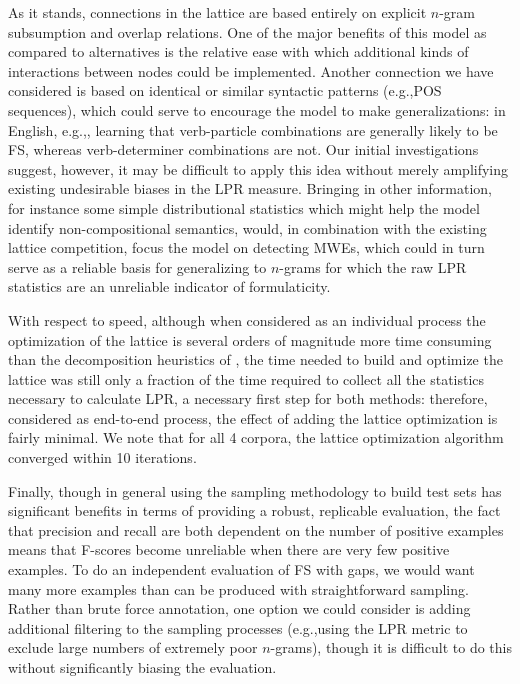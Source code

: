 \documentclass[11pt,letterpaper]{article}
\makeatletter
\def \eg {e.g.,\@ }
\makeatother
\begin{document}
As it stands, connections in the lattice are based entirely on explicit $n$-gram subsumption and overlap relations. One of the major benefits of this model as compared to alternatives is the relative ease with which additional kinds of interactions between nodes could be implemented. Another connection we have considered is based on identical or similar syntactic patterns (\eg POS sequences), which could serve to encourage the model to make generalizations: in English, \eg, learning that verb-particle combinations are generally likely to be FS, whereas verb-determiner combinations are not. Our initial investigations suggest, however, it may be difficult to apply this idea without merely amplifying existing undesirable biases in the LPR measure. Bringing in other information, for instance some simple distributional statistics which might help the model identify non-compositional semantics, would, in combination with the existing lattice competition, focus the model on detecting MWEs, which could in turn serve as a reliable basis for generalizing to $n$-grams for which the raw LPR statistics are an unreliable indicator of formulaticity.

With respect to speed, although when considered as an individual process the optimization of the lattice is several orders of magnitude more time consuming than the decomposition heuristics of , the time needed to build and optimize the lattice was still only a fraction of the time required to collect all the statistics necessary to calculate LPR, a necessary first step for both methods: therefore, considered as end-to-end process, the effect of adding the lattice optimization is fairly minimal. We note that for all 4 corpora, the lattice optimization algorithm converged within 10 iterations.


Finally, though in general using the sampling methodology to build test sets has significant benefits in terms of providing a robust, replicable evaluation, the fact that precision and recall are both dependent on the number of positive examples means that F-scores become unreliable when there are very few positive examples. To do an independent evaluation of FS with gaps, we would want many more examples than can be produced with straightforward sampling. Rather than brute force annotation, one option we could consider is adding additional filtering to the sampling processes (\eg using the LPR metric to exclude large numbers of extremely poor $n$-grams), though it is difficult to do this without significantly biasing the evaluation.
\end{document}

